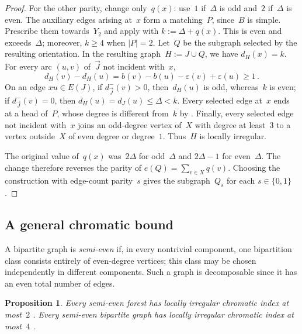 \documentclass[12pt,reqno,a4paper]{amsart}
\makeatletter
\newtheorem{proposition}[theorem]{Proposition}
\let\origsection=\section %
\def\section{\@ifstar{\origsection*}{\mysection}}
\def\mysection{\@startsection{section}{1}\z@{.7\linespacing\@plus\linespacing}{.5\linespacing}{\normalfont\scshape\centering\S}}
\makeatother
\begin{document}
\begin{proof}
  For the other parity, change only~$q(x)$: use~$1$ if~$\Delta$ is odd
  and~$2$ if~$\Delta$ is even.
  The auxiliary edges arising at~$x$ form a matching~$P$, since~$B$ is simple.
  Prescribe them towards~$Y_2$ and apply  with $k := \Delta +
  q(x)$.
  This is even and exceeds~$\Delta$; moreover, $k \ge 4$ when $|P| = 2$.
  Let~$Q$ be the subgraph selected by the resulting orientation.
  In the resulting graph~$H := J \cup Q$, we have $d_H(x) = k$.
  For every arc $(u,v)$ of~$\vec J$ not incident with~$x$,
  \[
    d_H(v) - d_H(u)
      = b(v) - b(u) - \varepsilon(v) + \varepsilon(u) \ge 1 \, .
  \]
  On an edge
  $xu \in E(J)$, if $d^-_{\vec J}(v) > 0$, then~$d_H(u)$ is odd, whereas~$k$ is
  even; if $d^-_{\vec J}(v) = 0$, then $d_H(u) = d_J(u) \le \Delta < k$.
  Every selected edge at~$x$ ends at a head of~$P$, whose degree is different
  from~$k$ by . 
  Finally, every selected edge not incident with~$x$ joins an odd-degree vertex
  of~$X$ with degree at least~$3$ to a vertex outside~$X$ of even degree or
  degree~$1$.
  Thus~$H$ is locally irregular.

  The original value of~$q(x)$ was~$2\Delta$ for odd~$\Delta$ and $2\Delta-1$
  for even~$\Delta$.
  The change therefore reverses the parity of $e(Q) = \sum_{v \in X} q(v)$.
  Choosing the construction with edge-count parity~$s$ gives the subgraph~$Q_s$
  for each $s \in \{0,1\}$.
\end{proof}

\section{Chromatic bounds}

\subsection{A general chromatic bound}
\label{sub:sec:chromatic_bound}

A bipartite graph is \emph{semi-even} if, in every nontrivial component, one
bipartition class consists entirely of even-degree vertices; this class may be
chosen independently in different components. 
Such a graph is decomposable since it has an even total number of edges. 

\begin{proposition}\label{prop:semi-even}
  Every semi-even forest has locally irregular chromatic index at most~$2$
  \cite[Lemma~3.2]{BeMeTh17}.
  Every semi-even bipartite graph has locally irregular chromatic index at
  most~$4$ \cite[Corollary~10]{LuPrSo18}.
\end{proposition}
\end{document}
